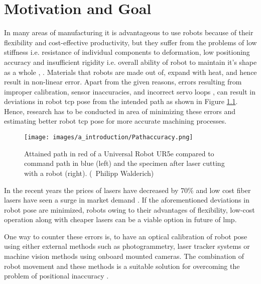 \chapter{Motivation and Goal}\label{chap:motivation_and_goal}

In many areas of manufacturing it is advantageous to use robots because of their flexibility and cost-effective productivity, but they suffer from the problems of low stiffness i.e. resistance of individual components to deformation, low positioning accuracy and insufficient rigidity i.e. overall ability of robot to maintain it's shape as a whole \cite{ji}, \cite{chen}. Materials that robots are made out of, expand with heat, and hence result in non-linear error. Apart from the given reasons, errors resulting from improper calibration, sensor inaccuracies, and incorrect servo loops \cite{greenway}, \cite{torgny} can result in deviations in robot \Gls{tcp} pose from the intended path as shown in Figure \ref{fig:fig_walderich}. Hence, research has to be conducted in area of minimizing these errors and estimating better robot \Gls{tcp} pose for more accurate machining processes.

\vspace{5mm}

    \vspace{5mm}
    \begin{figure}[h]
        \centering
        \texttt{[image: images/a\_introduction/Pathaccuracy.png]}
        \caption{Attained path in red of a Universal Robot UR5e compared to command path in blue (left) and the specimen after laser cutting with a robot (right). (\textcopyright \ Philipp Walderich) \cite{img_walderich}}
        \label{fig:fig_walderich}
    \end{figure}
    \vspace{5mm}

    \noindent In the recent years the prices of lasers have decreased by 70\% and low cost fiber lasers have seen a surge in market demand \cite{optech}. If the aforementioned deviations in robot pose are minimized, robots owing to their advantages of flexibility, low-cost operation along with cheaper lasers can be a viable option in future of \gls{lmp}.
    
    \vspace{5mm}

    \noindent One way to counter these errors is, to have an optical calibration of robot pose using either external methods such as photogrammetry, laser tracker systems or machine vision methods using onboard mounted cameras. The combination of robot movement and these methods is a suitable solution for overcoming the problem of positional inaccuracy \cite{perez}.
    
